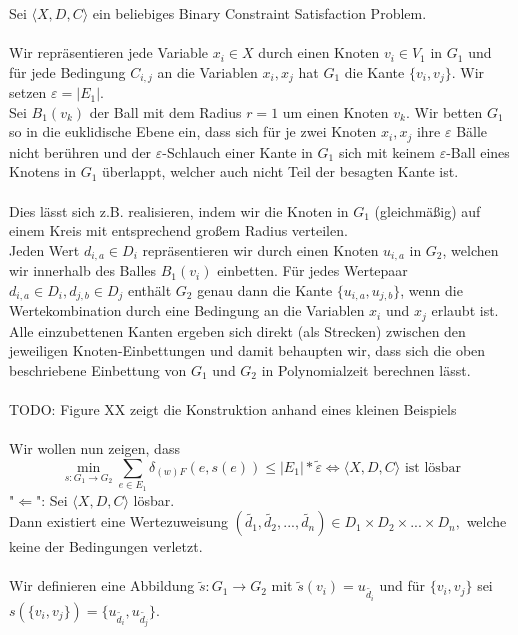 \documentclass[a4paper, 12pt, twoside]{article}
\theoremstyle{Format1} %
\begin{document}
Sei $\langle X,D,C \rangle$ ein beliebiges Binary Constraint Satisfaction Problem.
\\
\\
Wir repräsentieren jede Variable $x_i \in X$ durch einen Knoten $v_i \in V_1$ in $G_1$ und für jede Bedingung $C_{i,j}$ an die Variablen $x_i, x_j$
hat $G_1$ die Kante $\{v_i, v_j\}$. Wir setzen $\varepsilon = |E_1|$.
\\
Sei $B_1(v_k)$ der Ball mit dem Radius $r=1$ um einen Knoten $v_k$.
Wir betten $G_1$ so in die euklidische Ebene ein, dass sich für je zwei Knoten $x_i,x_j$ ihre $\varepsilon$ Bälle nicht berühren und
der $\varepsilon$-Schlauch einer Kante in $G_1$ sich mit keinem $\varepsilon$-Ball eines Knotens in $G_1$ überlappt, welcher auch nicht
Teil der besagten Kante ist.
\\
\\
Dies lässt sich z.B. realisieren, indem wir die Knoten in $G_1$ (gleichmäßig) auf einem Kreis mit entsprechend großem Radius verteilen.
\\
Jeden Wert $d_{i,a} \in D_i$ repräsentieren wir durch einen Knoten $u_{i,a}$ in $G_2$, welchen wir innerhalb des Balles $B_1(v_i)$ einbetten.
Für jedes Wertepaar $d_{i,a} \in D_i, d_{j,b} \in D_j$ enthält $G_2$ genau dann die Kante $\{u_{i,a},u_{j,b}\}$, wenn die Wertekombination
durch eine Bedingung an die Variablen $x_i$ und $x_j$ erlaubt ist.
\\
Alle einzubettenen Kanten ergeben sich direkt (als Strecken) zwischen den jeweiligen Knoten-Einbettungen und
damit behaupten wir, dass sich die oben beschriebene Einbettung von $G_1$ und $G_2$ in Polynomialzeit berechnen lässt.
\\
\\
TODO: Figure XX zeigt die Konstruktion anhand eines kleinen Beispiels
\\
\\
Wir wollen nun zeigen, dass
$$ \min_{s: G_1 \to G_2} \sum_{e \in E_1} \delta_{(w)F}(e, s(e)) \leq |E_1| * \tilde{\varepsilon} \iff \langle X,D,C \rangle \text{ ist lösbar}$$
"$\Leftarrow$":
Sei $\langle X,D,C \rangle$ lösbar.
\\
Dann existiert eine Wertezuweisung $(\tilde{d_1},\tilde{d_2},...,\tilde{d_n}) \in {D_1 \times D_2 \times ... \times D_n},$ welche keine der Bedingungen verletzt.
\\\\
Wir definieren eine Abbildung $\tilde{s}:G_1 \to G_2$ mit $\tilde{s}(v_i) = u_{\tilde{d_i}}$ und für $\{v_i, v_j\}$ sei $s(\{v_i,v_j\}) = \{u_{\tilde{d_i}},u_{\tilde{d_j}}\}$.
\end{document}
